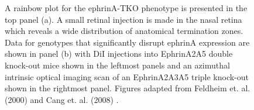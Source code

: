 \begin{figure}
\begin{subfigure}{0.3\textwidth}
		\caption{}
	\end{subfigure}
	\def\c{A rainbow plot for the ephrinA-TKO phenotype is presented. }
	\caption[\c]{\label{fig:ephrina2a5_rainbow} A rainbow plot for the ephrinA-TKO phenotype is presented in the top panel (a). A small retinal injection is made in the nasal retina which reveals a wide distribution of anatomical termination zones. Data for genotypes that significantly disrupt ephrinA expression are shown in panel (b) with DiI injections into EphrinA2A5 double knock-out mice shown in the leftmost panels and an azimuthal intrinsic optical imaging scan of an EphrinA2A3A5 triple knock-out shown in the rightmost panel. Figures adapted from Feldheim et. al. (2000) and Cang et. al. (2008) \cite{Feldheim2000-be, Cang2008-ez}. }
\end{figure}

